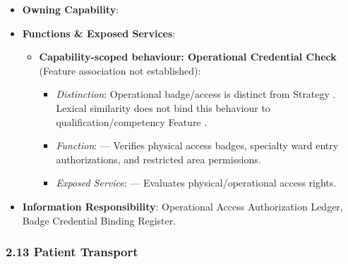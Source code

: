 \begin{itemize}

\item
\textbf{Owning Capability}: \texttt{}



\item
\textbf{Functions \& Exposed Services}:


\begin{itemize}

\item
\textbf{Capability-scoped behaviour: Operational Credential Check} (Feature association not established):


\begin{itemize}

\item
\emph{Distinction}: Operational badge/\allowbreak{}access \texttt{} is distinct from Strategy \texttt{}. Lexical similarity does not bind this behaviour to qualification/\allowbreak{}competency Feature \texttt{}.



\item
\emph{Function}: \texttt{} — Verifies physical access badges, specialty ward entry authorizations, and restricted area permissions.



\item
\emph{Exposed Service}: \texttt{} — Evaluates physical/\allowbreak{}operational access rights.



\end{itemize}


\end{itemize}


\item
\textbf{Information Responsibility}: Operational Access Authorization Ledger, Badge Credential Binding Register.



\end{itemize}
\label{rad:hso:247}

\par\smallskip
{}\label{rad:hso:249}
\subsubsection*{2.13 Patient Transport}
\label{rad:hso:250}

